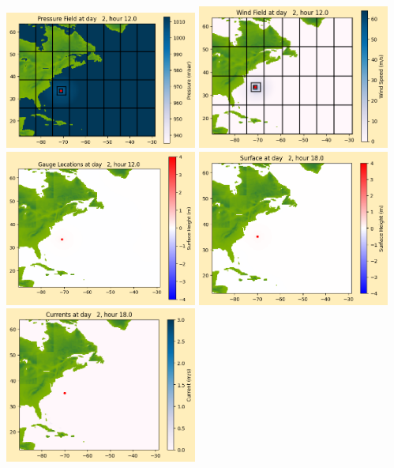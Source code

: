 \documentclass[11pt]{article}
\begin{document}
\includegraphics[width=0.475\textwidth]{frame0022fig1012.png}
\vskip 10pt 
\includegraphics[width=0.475\textwidth]{frame0022fig1013.png}
\includegraphics[width=0.475\textwidth]{frame0022fig1014.png}
\vskip 10pt 
\includegraphics[width=0.475\textwidth]{frame0023fig1001.png}
\includegraphics[width=0.475\textwidth]{frame0023fig1002.png}
\end{document}
